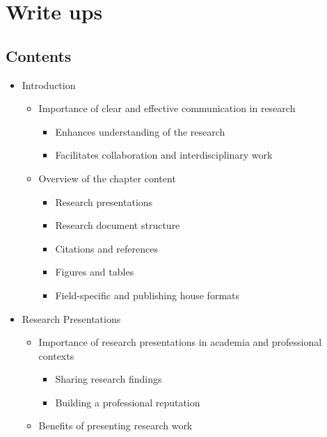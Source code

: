 \documentclass[
  letterpaper,
  DIV=11,
  numbers=noendperiod]{scrreprt}
\providecommand{\tightlist}{%
  \setlength{\itemsep}{0pt}\setlength{\parskip}{0pt}}\usepackage{longtable,booktabs,array}
\theoremstyle{definition}
\theoremstyle{remark}
\begin{document}
\section{Write ups}\label{sec-contr-write-ups}

\subsection{Contents}\label{contents}

\begin{itemize}
\tightlist
\item
  Introduction

  \begin{itemize}
  \tightlist
  \item
    Importance of clear and effective communication in research

    \begin{itemize}
    \tightlist
    \item
      Enhances understanding of the research
    \item
      Facilitates collaboration and interdisciplinary work
    \end{itemize}
  \item
    Overview of the chapter content

    \begin{itemize}
    \tightlist
    \item
      Research presentations
    \item
      Research document structure
    \item
      Citations and references
    \item
      Figures and tables
    \item
      Field-specific and publishing house formats
    \end{itemize}
  \end{itemize}
\item
  Research Presentations

  \begin{itemize}
  \tightlist
  \item
    Importance of research presentations in academia and professional
    contexts

    \begin{itemize}
    \tightlist
    \item
      Sharing research findings
    \item
      Building a professional reputation
    \end{itemize}
  \item
    Benefits of presenting research work


\end{itemize}
\end{itemize}
\end{document}
